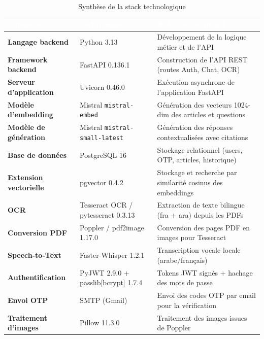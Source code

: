 \documentclass[12pt,a4paper]{report}
\begin{document}
\begin{table}[H]
\centering
\caption{Synthèse de la stack technologique}
\label{tab:stack}
\renewcommand{\arraystretch}{1.1}
\small
\begin{tabularx}{\linewidth}{>{\bfseries}p{3.8cm} p{3.6cm} X}
\arrayrulecolor{darkblue}\hline
\rowcolor{tableheader}
\textcolor{white}{\textbf{Catégorie}} &
\textcolor{white}{\textbf{Technologie}} &
\textcolor{white}{\textbf{Rôle dans le projet}} \\
\hline
\rowcolor{tableroweven} Langage backend & Python 3.13 & Développement de la logique métier et de l'API \\
\hline
\rowcolor{tablerowodd} Framework backend & FastAPI 0.136.1 & Construction de l'API REST (routes Auth, Chat, OCR) \\
\hline
\rowcolor{tableroweven} Serveur d'application & Uvicorn 0.46.0 & Exécution asynchrone de l'application FastAPI \\
\hline
\rowcolor{tablerowodd} Modèle d'embedding & Mistral \texttt{mistral-embed} & Génération des vecteurs 1024-dim des articles et questions \\
\hline
\rowcolor{tableroweven} Modèle de génération & Mistral \texttt{mistral-small-latest} & Génération des réponses contextualisées avec citations \\
\hline
\rowcolor{tablerowodd} Base de données & PostgreSQL 16 & Stockage relationnel (users, OTP, articles, historique) \\
\hline
\rowcolor{tableroweven} Extension vectorielle & pgvector 0.4.2 & Stockage et recherche par similarité cosinus des embeddings \\
\hline
\rowcolor{tablerowodd} OCR & Tesseract OCR / pytesseract 0.3.13 & Extraction de texte bilingue (fra + ara) depuis les PDFs \\
\hline
\rowcolor{tableroweven} Conversion PDF & Poppler / pdf2image 1.17.0 & Conversion des pages PDF en images pour Tesseract \\
\hline
\rowcolor{tablerowodd} Speech-to-Text & Faster-Whisper 1.2.1 & Transcription vocale locale (arabe/français) \\
\hline
\rowcolor{tableroweven} Authentification & PyJWT 2.9.0 + passlib[bcrypt] 1.7.4 & Tokens JWT signés + hachage des mots de passe \\
\hline
\rowcolor{tablerowodd} Envoi OTP & SMTP (Gmail) & Envoi des codes OTP par email pour la vérification \\
\hline
\rowcolor{tableroweven} Traitement d'images & Pillow 11.3.0 & Traitement des images issues de Poppler \\

\end{tabularx}
\end{table}
\end{document}

